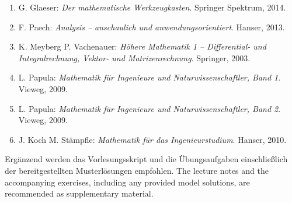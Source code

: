 
\begin{enumerate}[itemsep=0.2em,topsep=0.3em]
  \item G. Glaeser: \emph{Der mathematische Werkzeugkasten}.
    Springer Spektrum, 2014.
  \item F. Paech: \emph{Analysis -- anschaulich und anwendungsorientiert}.
    Hanser, 2013.
  \item K. Meyberg  P. Vachenauer: \emph{Höhere Mathematik 1 --
    Differential- und Integralrechnung, Vektor- und Matrizenrechnung}.
    Springer, 2003.
  \item L. Papula: \emph{Mathematik für Ingenieure und Naturwissenschaftler,
    Band 1}. Vieweg, 2009.
  \item L. Papula: \emph{Mathematik für Ingenieure und Naturwissenschaftler,
    Band 2}. Vieweg, 2009.
  \item J. Koch  M. Stämpfle: \emph{Mathematik für das Ingenieurstudium}.
    Hanser, 2010.
\end{enumerate}

\Lang
  {Ergänzend werden das Vorlesungsskript und die Übungsaufgaben einschließlich
   der bereitgestellten Musterlösungen empfohlen.}
  {The lecture notes and the accompanying exercises, including any provided model
   solutions, are recommended as supplementary material.}
